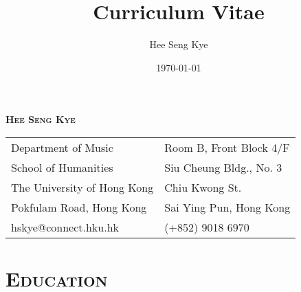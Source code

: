 \documentclass[a4,11pt,draft]{article}
\title{Curriculum Vitae}
\author{Hee Seng Kye}
\date{\today}
\begin{document}
  \renewcommand{\headrulewidth}{0pt}
  \fancyhf{}
 
  \fancyfoot[RE,RO]{\small \thepage}
  
  \raggedright \parindent=15pt
  
  \begin{center}
    {\LARGE \textsc{\textbf{Hee Seng Kye}}}
  \end{center}
  
  \vspace{8mm}
  
  \hspace*{-0.8cm}
  \begin{tabular}{p{11.5cm} l}
    Department of Music & Room B, Front Block 4/F \\
    School of Humanities & Siu Cheung Bldg., No. 3 \\
    The University of Hong Kong & Chiu Kwong St.\\
    Pokfulam Road, Hong Kong & Sai Ying Pun, Hong Kong\\
    hskye@connect.hku.hk & (+852) 9018 6970
  \end{tabular}
  
  \vspace{5mm}
  
  \section*{\textsc{Education}}
  
\end{document}

